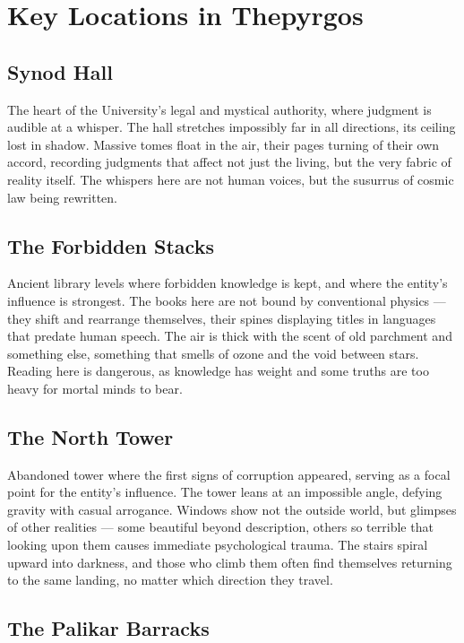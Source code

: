 \documentclass[11pt]{article}
\begin{document}
\section{Key Locations in Thepyrgos}

\subsection{Synod Hall}

The heart of the University's legal and mystical authority, where judgment is audible at a whisper. The hall stretches impossibly far in all directions, its ceiling lost in shadow. Massive tomes float in the air, their pages turning of their own accord, recording judgments that affect not just the living, but the very fabric of reality itself. The whispers here are not human voices, but the susurrus of cosmic law being rewritten.

\subsection{The Forbidden Stacks}

Ancient library levels where forbidden knowledge is kept, and where the entity's influence is strongest. The books here are not bound by conventional physics --- they shift and rearrange themselves, their spines displaying titles in languages that predate human speech. The air is thick with the scent of old parchment and something else, something that smells of ozone and the void between stars. Reading here is dangerous, as knowledge has weight and some truths are too heavy for mortal minds to bear.

\subsection{The North Tower}

Abandoned tower where the first signs of corruption appeared, serving as a focal point for the entity's influence. The tower leans at an impossible angle, defying gravity with casual arrogance. Windows show not the outside world, but glimpses of other realities --- some beautiful beyond description, others so terrible that looking upon them causes immediate psychological trauma. The stairs spiral upward into darkness, and those who climb them often find themselves returning to the same landing, no matter which direction they travel.

\subsection{The Palikar Barracks}
\end{document}
